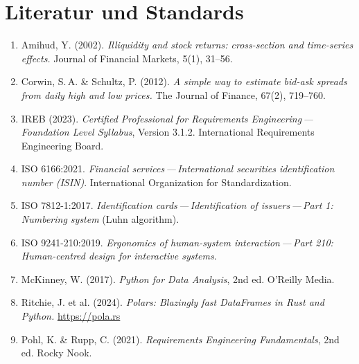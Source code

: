 \documentclass[12pt, a4paper, oneside]{report}
\begin{document}
\chapter{Literatur und Standards}
\label{app:references}

\begin{enumerate}
  \item Amihud, Y. (2002). \textit{Illiquidity and stock returns: cross-section and time-series effects.} Journal of Financial Markets, 5(1), 31--56.
  \item Corwin, S.\,A. \& Schultz, P. (2012). \textit{A simple way to estimate bid-ask spreads from daily high and low prices.} The Journal of Finance, 67(2), 719--760.
  \item IREB (2023). \textit{Certified Professional for Requirements Engineering\,---\,Foundation Level Syllabus}, Version 3.1.2. International Requirements Engineering Board.
  \item ISO 6166:2021. \textit{Financial services\,---\,International securities identification number (ISIN)}. International Organization for Standardization.
  \item ISO 7812-1:2017. \textit{Identification cards\,---\,Identification of issuers\,---\,Part 1: Numbering system} (Luhn algorithm).
  \item ISO 9241-210:2019. \textit{Ergonomics of human-system interaction\,---\,Part 210: Human-centred design for interactive systems}.
  \item McKinney, W. (2017). \textit{Python for Data Analysis}, 2nd ed. O'Reilly Media.
  \item Ritchie, J. et al. (2024). \textit{Polars: Blazingly fast DataFrames in Rust and Python.} \url{https://pola.rs}
  \item Pohl, K. \& Rupp, C. (2021). \textit{Requirements Engineering Fundamentals}, 2nd ed. Rocky Nook.
\end{enumerate}



\vfill
\end{document}
